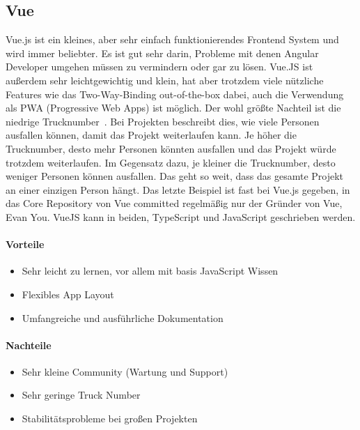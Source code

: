 \subsection{Vue}
\label{subsec:vue}
Vue.js ist ein kleines, aber sehr einfach funktionierendes Frontend System und wird immer beliebter.
Es ist gut sehr darin, Probleme mit denen Angular Developer umgehen müssen zu vermindern oder gar zu lösen.
Vue.JS ist außerdem sehr leichtgewichtig und klein, hat aber trotzdem viele nützliche Features wie das Two-Way-Binding
out-of-the-box dabei, auch die Verwendung als PWA (Progressive Web Apps) ist möglich.
Der wohl größte Nachteil ist die niedrige Trucknumber~\cite{truck-factor-of-popular-github-projects, what-is-the-bus-factor}.
Bei Projekten beschreibt dies, wie viele Personen ausfallen können, damit das Projekt weiterlaufen kann.
Je höher die Trucknumber, desto mehr Personen könnten ausfallen und das Projekt würde trotzdem weiterlaufen.
Im Gegensatz dazu, je kleiner die Trucknumber, desto weniger Personen können ausfallen.
Das geht so weit, dass das gesamte Projekt an einer einzigen Person hängt.
Das letzte Beispiel ist fast bei Vue.js gegeben, in das Core Repository von Vue committed regelmäßig nur der Gründer
von Vue, Evan You.
VueJS kann in beiden, TypeScript und JavaScript geschrieben werden.

\paragraph{Vorteile}
\begin{itemize}
    \item Sehr leicht zu lernen, vor allem mit basis JavaScript Wissen
    \item Flexibles App Layout
    \item Umfangreiche und ausführliche Dokumentation
\end{itemize}

\paragraph{Nachteile}
\begin{itemize}
    \item Sehr kleine Community (Wartung und Support)
    \item Sehr geringe Truck Number
    \item Stabilitätsprobleme bei großen Projekten
\end{itemize}


